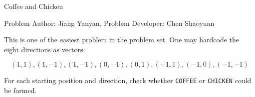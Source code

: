 \begin{Solution}{Coffee and Chicken}

\begin{frame}{\ProblemName}

\small Problem Author: Jiang Yanyan, Problem Developer: Chen Shaoyuan \par \vspace{0.3cm}


This is one of the easiest problem in the problem set. One may hardcode the eight directions as vectors: 

$$(1, 1), (1, -1), (1, -1), (0, -1), (0, 1), (-1, 1), (-1, 0), (-1, -1)$$

For each starting position and direction, check whether \texttt{COFFEE} or \texttt{CHICKEN} could be formed.

\end{frame}

\end{Solution}
